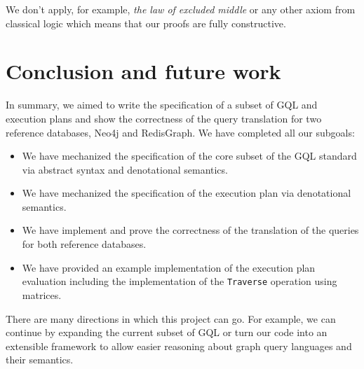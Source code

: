 \documentclass[14pt]{constructor-thesis}
\theoremstyle{definition}
\begin{document}
We don't apply, for example, \textit{the law of excluded middle} or any other axiom from classical logic which means that our proofs are fully constructive.

\section*{Conclusion and future work}

In summary, we aimed to write the specification of a subset of GQL and execution plans and show the correctness of the query translation for two reference databases, Neo4j and RedisGraph. We have completed all our subgoals:

\begin{itemize}
  \item We have mechanized the specification of the core subset of the GQL standard via abstract syntax and denotational semantics.
  \item We have mechanized the specification of the execution plan via denotational semantics.
  \item We have implement and prove the correctness of the translation of the queries for both reference databases.
  \item We have provided an example implementation of the execution plan evaluation including the implementation of the \texttt{Traverse} operation using matrices.
\end{itemize}

There are many directions in which this project can go. For example, we can continue by expanding the current subset of GQL or turn our code into an extensible framework to allow easier reasoning about graph query languages and their semantics.

\setmonofont[Mapping=tex-text]{CMU Typewriter Text}
% 
% 
\printbibliography
\end{document}
